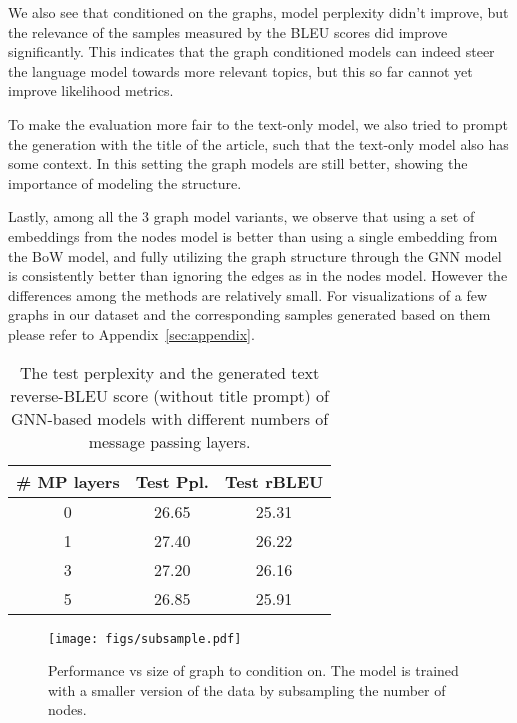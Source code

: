 \documentclass[11pt]{article}
\begin{document}
We also see that conditioned on the graphs, model perplexity didn't improve, but the relevance of the samples measured by the BLEU scores did improve significantly.  This indicates that the graph conditioned models can indeed steer the language model towards more relevant topics, but this so far cannot yet improve likelihood metrics. 

To make the evaluation more fair to the text-only model, we also tried to prompt the generation with the title of the article, such that the text-only model also has some context.  In this setting the graph models are still better, showing the importance of modeling the structure.

Lastly, among all the 3 graph model variants, we observe that using a set of embeddings from the nodes model is better than using a single embedding from the BoW model, and fully utilizing the graph structure through the GNN model is consistently better than ignoring the edges as in the nodes model.  However the differences among the methods are relatively small.
For visualizations of a few graphs in our dataset and the corresponding samples generated based on them please refer to Appendix~\ref{sec:appendix}.





\begin{table}[t]
    \centering
    \begin{tabular}{c|c|c}
    \hline
\# MP layers & Test Ppl. & Test rBLEU  \\
        \hline
        0 & 26.65 & 25.31 \\
        1 & 27.40 & 26.22  \\
        3 & 27.20 & 26.16 \\
        5 & 26.85 & 25.91 \\
        \hline
    \end{tabular}
    \caption{The test perplexity and the generated text reverse-BLEU score (without title prompt) of GNN-based models with different numbers of message passing layers.}
    \label{tab:gnn_layers}
\end{table}
\begin{figure}[t]
    \centering
    \texttt{[image: figs/subsample.pdf]}
    \caption{Performance vs size of graph to condition on. The model is trained with a smaller version of the data by subsampling the number of nodes.
}
    \label{fig:graphsize}
\end{figure}
\end{document}
